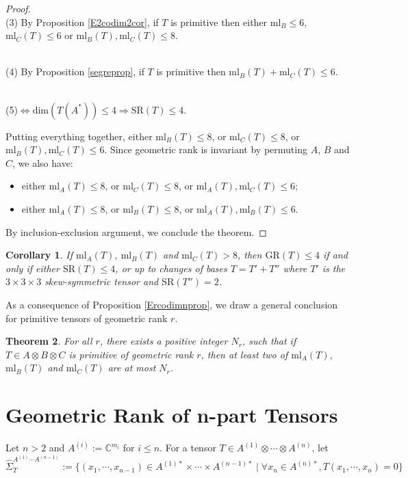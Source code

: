 \documentclass[10pt]{article} %
\newcommand{\SR}{\mathrm{SR}}
\newcommand{\ml}{\mathrm{ml}}
\newcommand{\BC}{\mathbb{C}}
\newcommand{\ot}{\otimes}
\newtheorem{thm}{Theorem}
\newtheorem{cor}[thm]{Corollary}
\theoremstyle{definition}
\begin{document}
\begin{proof}
~\\
(3) By Proposition \ref{E2codim2cor}, if $T$ is primitive then either $\ml_B\leq 6$, $\ml_C(T)\leq 6$ or $\ml_B(T),\ml_C(T)\leq 8$.

~\\
(4) By Proposition \ref{segreprop}, if $T$ is primitive then $\ml_B(T)+\ml_C(T)\leq 6$.

~\\
(5)$\iff \mathrm{dim}(T(A^*))\leq 4 \Rightarrow \mathrm{SR}(T)\leq 4$.

Putting everything together, either $\ml_B(T)\leq 8$, or $\ml_C(T)\leq 8$, or $\ml_B(T),\ml_C(T)\leq 6$. Since geometric rank is invariant by permuting $A$, $B$ and $C$, we also have: 
\begin{itemize}
    \item either $\ml_A(T)\leq 8$, or $\ml_C(T)\leq 8$, or $\ml_A(T),\ml_C(T)\leq 6$;
    \item either $\ml_A(T)\leq 8$, or $\ml_B(T)\leq 8$, or $\ml_A(T),\ml_B(T)\leq 6$.
\end{itemize}
By inclusion-exclusion argument, we conclude the theorem.
\end{proof}

\begin{cor} If $\ml_A(T)$, $\ml_B(T)$ and $\ml_C(T)>8$, then $\mathrm{GR}(T)\leq 4$ if and only if either $\mathrm{SR}(T)\leq 4$, or up to changes of bases $T=T'+T''$ where $T'$ is the $3\times3\times3$ skew-symmetric tensor and $\SR(T'')= 2$.
\end{cor}

As a consequence of Proposition \ref{Ercodimnprop}, we draw a general conclusion for primitive tensors of geometric rank $r$.

\begin{thm}\label{grrthm}
For all $r$, there exists a positive integer $N_r$, such that if $T\in A\ot B\ot C$ is primitive of geometric rank $r$, then at least two of $\ml_A(T)$, $\ml_B(T)$ and $\ml_C(T)$ are at most $N_r$.
\end{thm}

\section{Geometric Rank of n-part Tensors}\label{section:npart}
Let $n>2$ and $A^{(i)}:=\BC^{m_i}$ for $i\leq n$. For a tensor $T\in A^{(1)}\otimes\cdots\otimes A^{(n)}$, let
$$\hat{\Sigma}_T^{A^{(1)}\cdots A^{(n-1)}}:=\{(x_1,\cdots,x_{n-1})\in A^{(1)*}\times\cdots\times A^{(n-1)*}\mid \forall x_n\in A^{(n)*}, T(x_1,\cdots,x_n)=0\}$$
\end{document}
